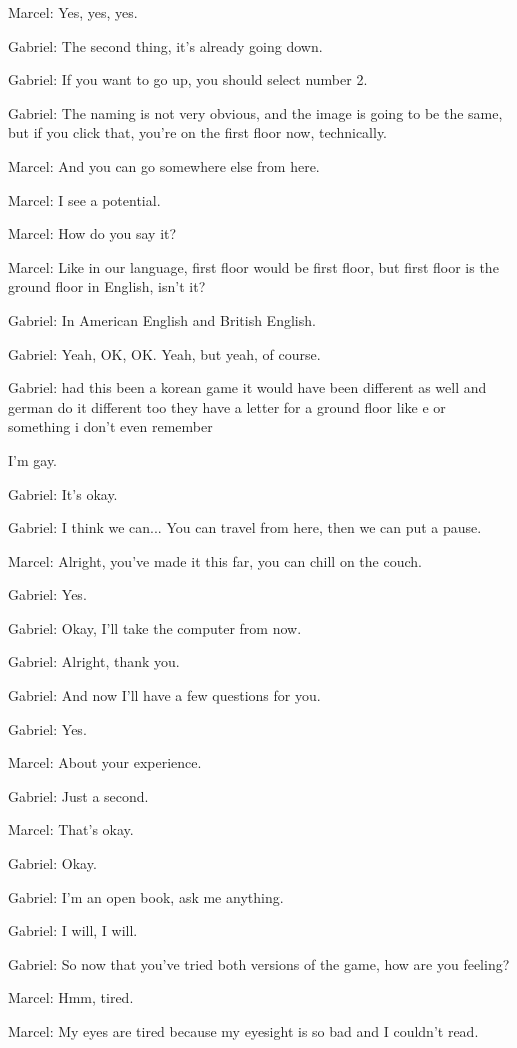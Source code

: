 Marcel: Yes, yes, yes.

Gabriel: The second thing, it's already going down.

Gabriel: If you want to go up, you should select number 2.

Gabriel: The naming is not very obvious, and the image is going to be the same, but if you click that, you're on the first floor now, technically.

Marcel: And you can go somewhere else from here.

Marcel: I see a potential.

Marcel: How do you say it?

Marcel: Like in our language, first floor would be first floor, but first floor is the ground floor in English, isn't it?

Gabriel: In American English and British English.

Gabriel: Yeah, OK, OK. Yeah, but yeah, of course.

Gabriel: had this been a korean game it would have been different as well and german do it different too they have a letter for a ground floor like e or something i don't even remember

I'm gay.

Gabriel: It's okay.

Gabriel: I think we can... You can travel from here, then we can put a pause.

Marcel: Alright, you've made it this far, you can chill on the couch.

Gabriel: Yes.

Gabriel: Okay, I'll take the computer from now.

Gabriel: Alright, thank you.

Gabriel: And now I'll have a few questions for you.

Gabriel: Yes.

Marcel: About your experience.

Gabriel: Just a second.

Marcel: That's okay.

Gabriel: Okay.

Gabriel: I'm an open book, ask me anything.

Gabriel: I will, I will.

Gabriel: So now that you've tried both versions of the game, how are you feeling?

Marcel: Hmm, tired.

Marcel: My eyes are tired because my eyesight is so bad and I couldn't read.

